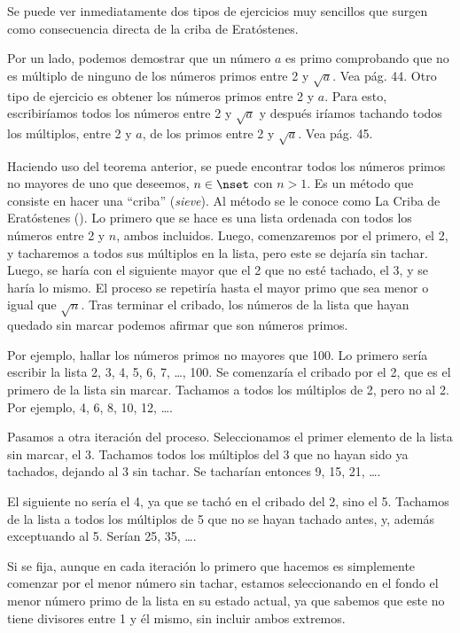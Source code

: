 Se puede ver inmediatamente dos tipos de ejercicios muy sencillos que surgen
como consecuencia directa de la criba de Eratóstenes.

Por un lado, podemos demostrar que un número $a$ es primo comprobando que no
es múltiplo de ninguno de los números primos entre 2 y $\sqrt{a}$. Vea
\cite{burton} pág. 44. Otro tipo de ejercicio es obtener los
números primos entre 2 y $a$. Para esto, escribiríamos todos los números
entre 2 y $\sqrt{a}$ y después iríamos tachando todos los múltiplos, entre 2
y $a$, de los primos entre 2 y $\sqrt{a}$. Vea \cite{burton}
pág. 45.

Haciendo uso del teorema anterior, se puede encontrar todos los números
primos no mayores de uno que deseemos, $n \in \nset$ con $n > 1$. Es un
método que consiste en hacer una ``criba'' (\emph{sieve}). Al método se le
conoce como La Criba de Eratóstenes (). Lo
primero que se hace es una lista ordenada con todos los números entre 2 y
$n$, ambos incluidos. Luego, comenzaremos por el primero, el 2, y tacharemos
a todos sus múltiplos en la lista, pero este se dejaría sin tachar. Luego,
se haría con el siguiente mayor que el 2 que no esté tachado, el 3, y se
haría lo mismo. El proceso se repetiría hasta el mayor primo que sea menor o
igual que $\sqrt{n}$. Tras terminar el cribado, los números de la lista que
hayan quedado sin marcar podemos afirmar que son números primos.

Por ejemplo, hallar los números primos no mayores que 100. Lo primero sería
escribir la lista 2, 3, 4, 5, 6, 7, \ldots, 100. Se comenzaría el cribado
por el 2, que es el primero de la lista sin marcar. Tachamos a todos los
múltiplos de 2, pero no al 2. Por ejemplo, 4, 6, 8, 10, 12, \ldots.

Pasamos a otra iteración del proceso. Seleccionamos el primer elemento de la
lista sin marcar, el 3. Tachamos todos los múltiplos del 3 que no hayan sido
ya tachados, dejando al 3 sin tachar. Se tacharían entonces 9, 15, 21,
\ldots.

El siguiente no sería el 4, ya que se tachó en el cribado del 2, sino el 5.
Tachamos de la lista a todos los múltiplos de 5 que no se hayan tachado
antes, y, además exceptuando al 5. Serían 25, 35, \ldots.

Si se fija, aunque en cada iteración lo primero que hacemos es simplemente
comenzar por el menor número sin tachar, estamos seleccionando en el fondo
el menor número primo de la lista en su estado actual, ya que sabemos que
este no tiene divisores entre 1 y él mismo, sin incluir ambos extremos.

